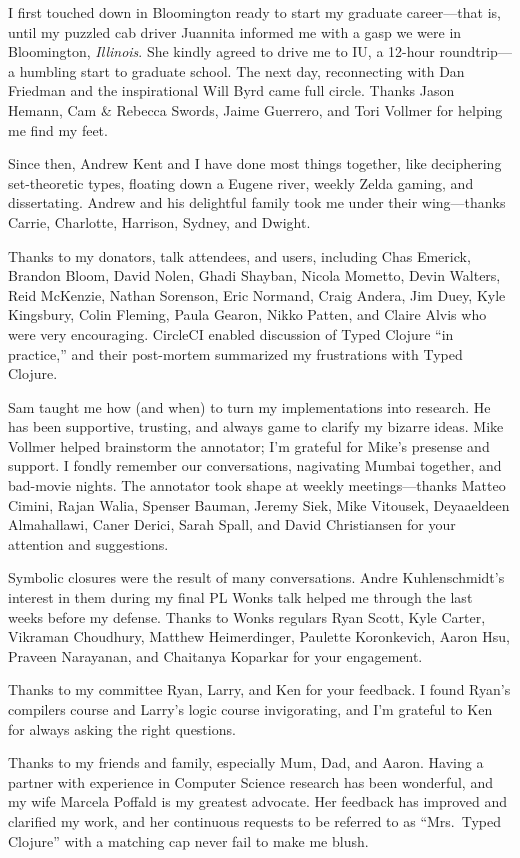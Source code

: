 I first touched down in Bloomington ready to start my graduate career---that is, until 
my puzzled cab driver Juannita informed me with a gasp
we were in Bloomington, \emph{Illinois}.
She kindly agreed to drive me to IU, a 12-hour roundtrip---a humbling start to graduate school.
The next day, reconnecting with Dan Friedman and the inspirational Will Byrd came full circle.
Thanks Jason Hemann, Cam \& Rebecca Swords, Jaime Guerrero, 
and Tori Vollmer for helping me find my feet.

Since then, Andrew Kent and I have done most things together, like deciphering 
set-theoretic types, floating down a Eugene river,
weekly Zelda gaming, and dissertating.
Andrew and his delightful family took me under their wing---thanks
Carrie, Charlotte, Harrison, Sydney, and Dwight.

Thanks to my donators, talk attendees, and users, including
Chas Emerick, Brandon Bloom, David Nolen,
Ghadi Shayban, Nicola Mometto, Devin Walters, Reid McKenzie, Nathan Sorenson, Eric
Normand, Craig Andera, Jim Duey, Kyle Kingsbury, Colin Fleming, Paula Gearon,
Nikko Patten, and Claire Alvis who were very encouraging.
CircleCI enabled discussion of Typed Clojure ``in practice,'' and their post-mortem
summarized my frustrations with Typed Clojure.

Sam taught me how (and when) to turn my implementations into research.
He has been supportive, trusting, and always game to clarify my bizarre ideas.
Mike Vollmer helped brainstorm the annotator;
I'm grateful for Mike's presense and support. I fondly remember our
conversations, nagivating Mumbai together, and bad-movie nights.
The annotator took shape at weekly meetings---thanks
Matteo Cimini, Rajan Walia, Spenser Bauman, Jeremy Siek, Mike Vitousek, Deyaaeldeen Almahallawi,
Caner Derici, Sarah Spall, and David Christiansen for your attention and suggestions.

Symbolic closures were the result of many conversations.
Andre Kuhlenschmidt's interest in them during my final PL Wonks talk
helped me through the last weeks before my defense.
Thanks to Wonks regulars  
Ryan Scott, Kyle Carter, 
Vikraman Choudhury, Matthew Heimerdinger, Paulette Koronkevich, Aaron Hsu, Praveen Narayanan,
and Chaitanya Koparkar for your engagement.

Thanks to my committee Ryan, Larry, and Ken for your feedback.
I found Ryan's compilers course and Larry's logic course invigorating,
and I'm grateful to Ken for always asking the right questions.

Thanks to my friends and family, especially Mum, Dad, and Aaron.
Having a partner with experience in Computer Science research has been wonderful, 
and my wife Marcela Poffald is my greatest advocate.
Her feedback has improved and clarified my work,
and her continuous requests
to be referred to as ``Mrs.~Typed Clojure'' with a matching cap never
fail to make me blush.
